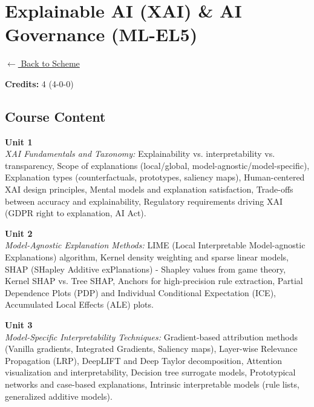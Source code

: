 \section*{Explainable AI (XAI) \& AI Governance (ML-EL5)}
\label{elec:ML_5}

\noindent \small{\hyperref[main:scheme]{$\leftarrow$ Back to Scheme}} \vspace{0.5cm}

\noindent \textbf{Credits:} 4 (4-0-0)

\subsection*{Course Content}
\noindent\textbf{Unit 1} \\
\textit{XAI Fundamentals and Taxonomy:} Explainability vs. interpretability vs. transparency, Scope of explanations (local/global, model-agnostic/model-specific), Explanation types (counterfactuals, prototypes, saliency maps), Human-centered XAI design principles, Mental models and explanation satisfaction, Trade-offs between accuracy and explainability, Regulatory requirements driving XAI (GDPR right to explanation, AI Act).

\vspace{0.3cm}

\noindent\textbf{Unit 2} \\
\textit{Model-Agnostic Explanation Methods:} LIME (Local Interpretable Model-agnostic Explanations) algorithm, Kernel density weighting and sparse linear models, SHAP (SHapley Additive exPlanations) - Shapley values from game theory, Kernel SHAP vs. Tree SHAP, Anchors for high-precision rule extraction, Partial Dependence Plots (PDP) and Individual Conditional Expectation (ICE), Accumulated Local Effects (ALE) plots.

\vspace{0.3cm}

\noindent\textbf{Unit 3} \\
\textit{Model-Specific Interpretability Techniques:} Gradient-based attribution methods (Vanilla gradients, Integrated Gradients, Saliency maps), Layer-wise Relevance Propagation (LRP), DeepLIFT and Deep Taylor decomposition, Attention visualization and interpretability, Decision tree surrogate models, Prototypical networks and case-based explanations, Intrinsic interpretable models (rule lists, generalized additive models).

\vspace{0.3cm}

